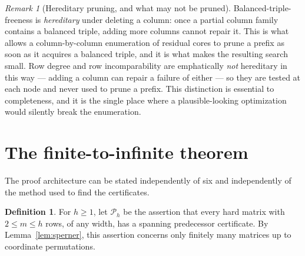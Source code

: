 \documentclass[11pt,letterpaper]{article}
\numberwithin{equation}{section}
\theoremstyle{definition}
\newtheorem{definition}[theorem]{Definition}
\theoremstyle{remark}
\newtheorem{remark}[theorem]{Remark}
\begin{document}
\begin{remark}[Hereditary pruning, and what may not be pruned]
\label{rem:hereditary}
Balanced-triple-freeness is \emph{hereditary} under deleting a column: once a
partial column family contains a balanced triple, adding more columns cannot
repair it. This is what allows a column-by-column enumeration of residual
cores to prune a prefix as soon as it acquires a balanced triple, and it is
what makes the resulting search small. Row degree and row incomparability are
emphatically \emph{not} hereditary in this way --- adding a column can repair
a failure of either --- so they are tested at each node and never used to
prune a prefix. This distinction is essential to completeness, and it is the
single place where a plausible-looking optimization would silently break the
enumeration.
\end{remark}

\section{The finite-to-infinite theorem}
\label{sec:induction}
The proof architecture can be stated independently of six and independently
of the method used to find the certificates.

\begin{definition}
For $h\ge1$, let $\mathcal P_h$ be the assertion that every hard matrix with
$2\le m\le h$ rows, of any width, has a spanning predecessor certificate.
By Lemma~\ref{lem:sperner}, this assertion concerns only finitely many
matrices up to coordinate permutations.
\end{definition}
\end{document}
